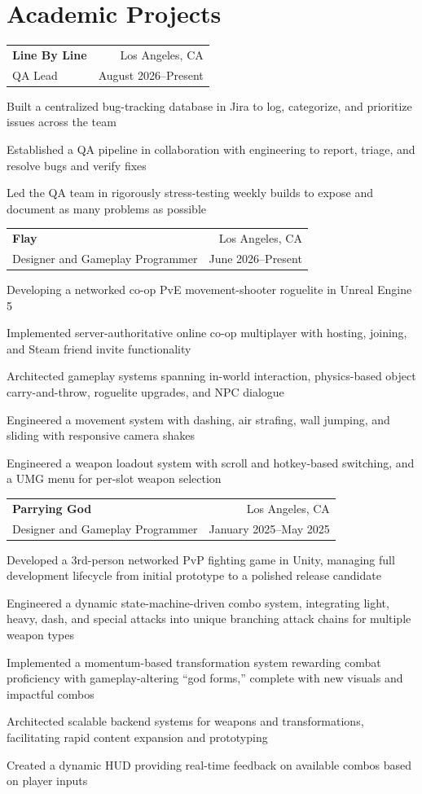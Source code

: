 \documentclass[letterpaper,10pt]{article}
\makeatletter
\newcommand{\entry}[4]{%
  \noindent\begin{tabularx}{\textwidth}{@{}X r@{}}
    \textbf{#1} & #2 \\
    #3 & #4 \\
  \end{tabularx}%
  \vspace{-2pt}
}
\makeatother
\begin{document}
\section{Academic Projects}
\entry{Line By Line}{Los Angeles, CA}
      {QA Lead}{August 2026--Present}
\begin{tight}
  \item Built a centralized bug-tracking database in Jira to log, categorize, and prioritize issues across the team
  \item Established a QA pipeline in collaboration with engineering to report, triage, and resolve bugs and verify fixes
  \item Led the QA team in rigorously stress-testing weekly builds to expose and document as many problems as possible
\end{tight}
\vspace{2pt}
\entry{Flay}{Los Angeles, CA}
      {Designer and Gameplay Programmer}{June 2026--Present}
\begin{tight}
  \item Developing a networked co-op PvE movement-shooter roguelite in Unreal Engine 5
  \item Implemented server-authoritative online co-op multiplayer with hosting, joining, and Steam friend invite functionality
  \item Architected gameplay systems spanning in-world interaction, physics-based object carry-and-throw, roguelite upgrades, and NPC dialogue
  \item Engineered a movement system with dashing, air strafing, wall jumping, and sliding with responsive camera shakes
  \item Engineered a weapon loadout system with scroll and hotkey-based switching, and a UMG menu for per-slot weapon selection
\end{tight}
\vspace{2pt}
\entry{Parrying God}{Los Angeles, CA}
      {Designer and Gameplay Programmer}{January 2025--May 2025}
\begin{tight}
  \item Developed a 3rd-person networked PvP fighting game in Unity, managing full development lifecycle from initial prototype to a polished release candidate
  \item Engineered a dynamic state-machine-driven combo system, integrating light, heavy, dash, and special attacks into unique branching attack chains for multiple weapon types
  \item Implemented a momentum-based transformation system rewarding combat proficiency with gameplay-altering ``god forms,'' complete with new visuals and impactful combos
  \item Architected scalable backend systems for weapons and transformations, facilitating rapid content expansion and prototyping
  \item Created a dynamic HUD providing real-time feedback on available combos based on player inputs
\end{tight}
\end{document}
